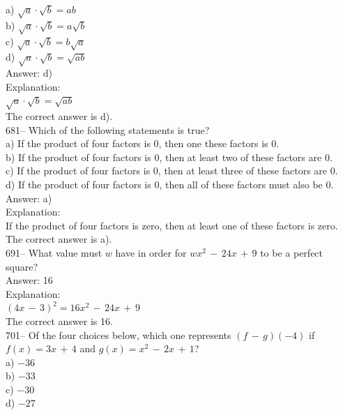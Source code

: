 \documentclass[letterpaper, 12pt]{article}
\begin{document}
a) $\sqrt{a}\cdot\sqrt{b}=ab$\\
b) $\sqrt{a}\cdot\sqrt{b}=a\sqrt{b}$\\
c) $\sqrt{a}\cdot\sqrt{b}=b\sqrt{a}$\\
d) $\sqrt{a}\cdot\sqrt{b}=\sqrt{ab}$\\

Answer: d)\\

Explanation: \\
$\sqrt{a}\cdot\sqrt{b}=\sqrt{ab}$\\
The correct answer is d).\\

681-- Which of the following statements is true?\\

a) If the product of four factors is 0, then one these factors is 0.  \\
b) If the product of four factors is 0, then at least two of these factors are 0.  \\
c) If the product of four factors is 0, then at least three of these factors are 0.  \\
d) If the product of four factors is 0, then all of these factors must also be 0.\\

Answer: a)\\

Explanation: \\
If the product of four factors is zero, then at least one of these factors is zero.  \\
The correct answer is a).\\

691-- What value must $w$ have in order for $wx^{2}\,-\,24x\,+\,9$ to be a perfect square?\\

Answer: 16\\

Explanation: \\
$(4x\,-\,3)^{2}=16x^{2}\,-\,24x\,+\,9$\\
The correct answer is 16.\\

701-- Of the four choices below, which one represents $(f\,-\,g)(-4)$
if $f(x)=3x\,+\,4$ and $g(x)=x^{2}\,-\,2x\,+\,1$?\\

a) $-36$\\
b) $-33$\\
c) $-30$\\
d) $-27$\\
\end{document}
